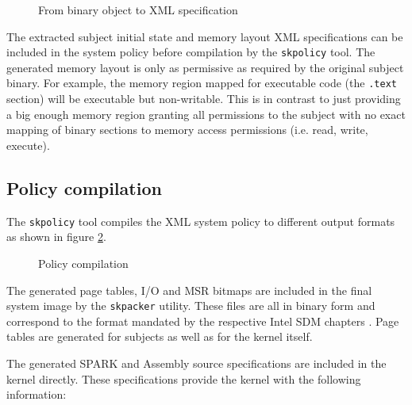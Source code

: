 \begin{figure}[h]
	\centering
	
	\caption{From binary object to XML specification}
	\label{fig:object-analysis}
\end{figure}

The extracted subject initial state and memory layout XML specifications can be
included in the system policy before compilation by the \texttt{skpolicy} tool.
The generated memory layout is only as permissive as required by the original
subject binary. For example, the memory region mapped for executable code
(the \texttt{.text} section) will be executable but non-writable. This is in
contrast to just providing a big enough memory region granting all permissions
to the subject with no exact mapping of binary sections to memory access
permissions (i.e. read, write, execute).

\subsection{Policy compilation}\label{subsec:policy-compilation}
The \texttt{skpolicy} tool compiles the XML system policy to different output
formats as shown in figure \ref{fig:policy-compilation}.

\begin{figure}[h]
	\centering
	
	\caption{Policy compilation}
	\label{fig:policy-compilation}
\end{figure}

The generated page tables, I/O and MSR bitmaps are included in the final system
image by the \texttt{skpacker} utility. These files are all in binary form and
correspond to the format mandated by the respective Intel SDM chapters
\cite{IntelSDM}. Page tables are generated for subjects as well as for the
kernel itself.

The generated SPARK and Assembly source specifications are included in the
kernel directly. These specifications provide the kernel with the following
information:

